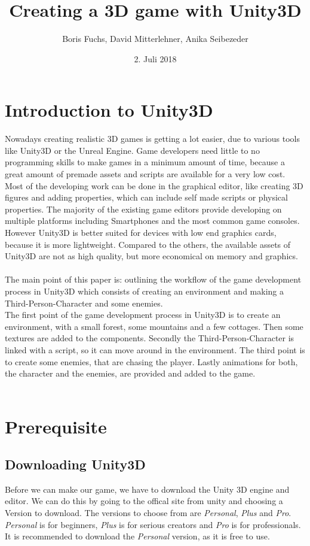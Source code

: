 \documentclass[12pt, a4paper, titlepage]{article}
\title{Creating a 3D game with Unity3D}
\date{2. Juli 2018}
\author{Boris Fuchs, David Mitterlehner, Anika Seibezeder}
\begin{document}
\maketitle
\tableofcontents 

\section{Introduction to Unity3D}
Nowadays creating realistic 3D games is getting a lot easier, due to various tools like Unity3D or the Unreal Engine. Game developers need little to no programming skills to make games in a minimum amount of time, because a great amount of premade assets and scripts are available for a very low cost. Most of the developing work can be done in the graphical editor, like creating 3D figures and adding properties, which can include self made scripts or physical properties. The majority of the existing game editors provide developing on multiple platforms including Smartphones and the most common game consoles. However Unity3D is better suited for devices with low end graphics cards, because it is more lightweight. Compared to the others, the available assets of Unity3D are not as high quality, but more economical on memory and graphics. \\ \\
The main point of this paper is: outlining the workflow of the game development process in Unity3D which consists of creating an environment and making a Third-Person-Character and some enemies.  \\
The first point of the game development process in Unity3D is to create an environment, with a small forest, some mountains and a few cottages. Then some textures are added to the components.
Secondly the Third-Person-Character is linked with a  script, so it can move around in the environment.
The third point is to create some enemies, that are chasing the player. 
Lastly animations for both, the character and the enemies, are provided and added to the game. \\ \\

\section{Prerequisite}
\subsection{Downloading Unity3D}
Before we can make our game, we have to download the Unity 3D engine and editor. We can do this by going to the offical site from unity \cite{b4} and choosing a Version to download. The versions to choose from are \emph{Personal}, \emph{Plus} and \emph{Pro}. \emph{Personal} is for beginners, \emph{Plus} is for serious creators and \emph{Pro} is for professionals. It is recommended to download the \emph{Personal} version, as it is free to use.
\end{document}
